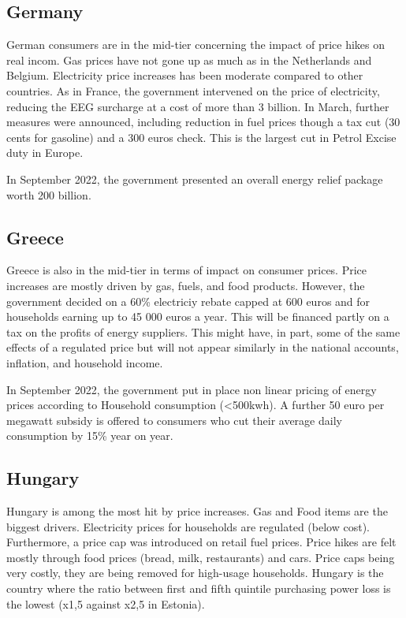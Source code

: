 \documentclass[
  9pt,
  a4paper,
  numbers=noendperiod,
  DIV=12]{scrartcl}
\begin{document}
\hypertarget{germany}{%
\subsection{Germany}\label{germany}}

German consumers are in the mid-tier concerning the impact of price
hikes on real incom. Gas prices have not gone up as much as in the
Netherlands and Belgium. Electricity price increases has been moderate
compared to other countries. As in France, the government intervened on
the price of electricity, reducing the EEG surcharge at a cost of more
than 3 billion. In March, further measures were announced, including
reduction in fuel prices though a tax cut (30 cents for gasoline) and a
300 euros check. This is the largest cut in Petrol Excise duty in
Europe.

In September 2022, the government presented an overall energy relief
package worth 200 billion.

\hypertarget{greece}{%
\subsection{Greece}\label{greece}}

Greece is also in the mid-tier in terms of impact on consumer prices.
Price increases are mostly driven by gas, fuels, and food products.
However, the government decided on a 60\% electriciy rebate capped at
600 euros and for households earning up to 45 000 euros a year. This
will be financed partly on a tax on the profits of energy suppliers.
This might have, in part, some of the same effects of a regulated price
but will not appear similarly in the national accounts, inflation, and
household income.

In September 2022, the government put in place non linear pricing of
energy prices according to Household consumption (\textless500kwh). A
further 50 euro per megawatt subsidy is offered to consumers who cut
their average daily consumption by 15\% year on year.

\hypertarget{hungary}{%
\subsection{Hungary}\label{hungary}}

Hungary is among the most hit by price increases. Gas and Food items are
the biggest drivers. Electricity prices for households are regulated
(below cost). Furthermore, a price cap was introduced on retail fuel
prices. Price hikes are felt mostly through food prices (bread, milk,
restaurants) and cars. Price caps being very costly, they are being
removed for high-usage households. Hungary is the country where the
ratio between first and fifth quintile purchasing power loss is the
lowest (x1,5 against x2,5 in Estonia).
\end{document}
